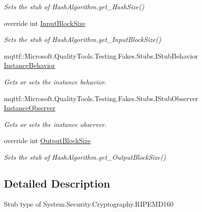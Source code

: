 \begin{DoxyCompactItemize}
\begin{DoxyCompactList}\small\item\em Sets the stub of Hash\-Algorithm.\-get\-\_\-\-Hash\-Size()\end{DoxyCompactList}\item 
override int \hyperlink{class_system_1_1_security_1_1_cryptography_1_1_fakes_1_1_stub_r_i_p_e_m_d160_a2385dcc61bf11cbceaaf75a39554f857}{Input\-Block\-Size}
\begin{DoxyCompactList}\small\item\em Sets the stub of Hash\-Algorithm.\-get\-\_\-\-Input\-Block\-Size()\end{DoxyCompactList}\item 
mqttf\-::\-Microsoft.\-Quality\-Tools.\-Testing.\-Fakes.\-Stubs.\-I\-Stub\-Behavior \hyperlink{class_system_1_1_security_1_1_cryptography_1_1_fakes_1_1_stub_r_i_p_e_m_d160_a992e943a2cef31d0303c44b74a71191c}{Instance\-Behavior}
\begin{DoxyCompactList}\small\item\em Gets or sets the instance behavior.\end{DoxyCompactList}\item 
mqttf\-::\-Microsoft.\-Quality\-Tools.\-Testing.\-Fakes.\-Stubs.\-I\-Stub\-Observer \hyperlink{class_system_1_1_security_1_1_cryptography_1_1_fakes_1_1_stub_r_i_p_e_m_d160_a18d32edd4193e4c6421c67a265eb9f51}{Instance\-Observer}
\begin{DoxyCompactList}\small\item\em Gets or sets the instance observer.\end{DoxyCompactList}\item 
override int \hyperlink{class_system_1_1_security_1_1_cryptography_1_1_fakes_1_1_stub_r_i_p_e_m_d160_aed5d56e9bc463c9170ed554079909b80}{Output\-Block\-Size}
\begin{DoxyCompactList}\small\item\em Sets the stub of Hash\-Algorithm.\-get\-\_\-\-Output\-Block\-Size()\end{DoxyCompactList}\end{DoxyCompactItemize}


\subsection{Detailed Description}
Stub type of System.\-Security.\-Cryptography.\-R\-I\-P\-E\-M\-D160



